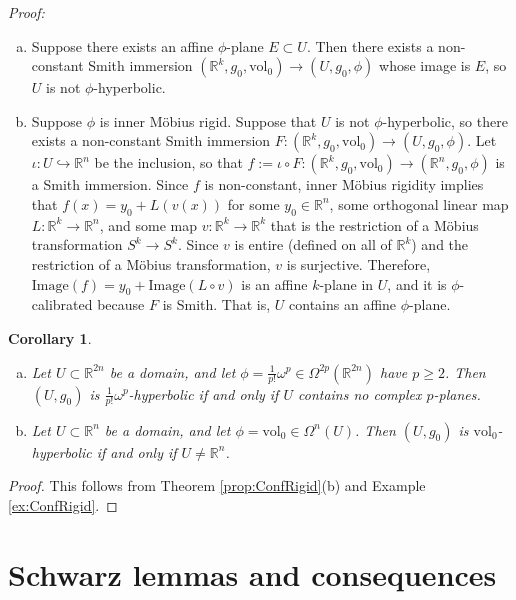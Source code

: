 \documentclass[11pt]{article}
\newcommand{\R}{\mathbb{R}}
\newcommand{\vol}{\mathrm{vol}}
\newtheorem{cor}[thm]{Corollary}
\theoremstyle{definition}
\numberwithin{equation}{section}
\begin{document}
\noindent \textit{Proof:}
\begin{enumerate}[(a)]
\item Suppose there exists an affine $\phi$-plane $E \subset U$.  Then there exists a non-constant Smith immersion $(\R^k, g_0, \vol_0) \to (U, g_0, \phi)$ whose image is $E$, so $U$ is not $\phi$-hyperbolic.
\item Suppose $\phi$ is inner M\"{o}bius rigid.  Suppose that $U$ is not $\phi$-hyperbolic, so there exists a non-constant Smith immersion $F \colon (\R^k, g_0, \vol_0) \to (U, g_0, \phi)$.  Let $\iota \colon U \hookrightarrow \R^n$ be the inclusion, so that $f := \iota \circ F \colon (\R^k, g_0, \vol_0) \to (\R^n, g_0, \phi)$ is a Smith immersion.  Since $f$ is non-constant, inner M\"{o}bius rigidity implies that $f(x) = y_0 + L(v(x))$ for some $y_0 \in \R^n$, some orthogonal linear map $L \colon \R^k \to \R^n$, and some map $v \colon \R^k \to \R^k$ that is the restriction of a M\"{o}bius transformation $S^k \to S^k$.  Since $v$ is entire (defined on all of $\R^k$) and the restriction of a M\"{o}bius transformation, $v$ is surjective.  Therefore, $\mathrm{Image}(f) = y_0 + \mathrm{Image}(L \circ v)$ is an affine $k$-plane in $U$, and it is $\phi$-calibrated because $F$ is Smith.  That is, $U$ contains an affine $\phi$-plane.
\end{enumerate}

\pagebreak

\begin{cor}  ${}$
\begin{enumerate}[(a)]
\item Let $U \subset \R^{2n}$ be a domain, and let $\phi = \frac{1}{p!}\omega^p \in \Omega^{2p}(\R^{2n})$ have $p \geq 2$.  Then $(U,g_0)$ is $\frac{1}{p!}\omega^p$-hyperbolic if and only if $U$ contains no complex $p$-planes.
\item Let $U \subset \R^n$ be a domain, and let $\phi = \vol_0 \in \Omega^n(U)$.  Then $(U, g_0)$ is $\vol_0$-hyperbolic if and only if $U \neq \R^n$.
\end{enumerate}
\end{cor}
\begin{proof} This follows from Theorem \ref{prop:ConfRigid}(b) and Example \ref{ex:ConfRigid}.
\end{proof}

\section{Schwarz lemmas and consequences}
\end{document}
